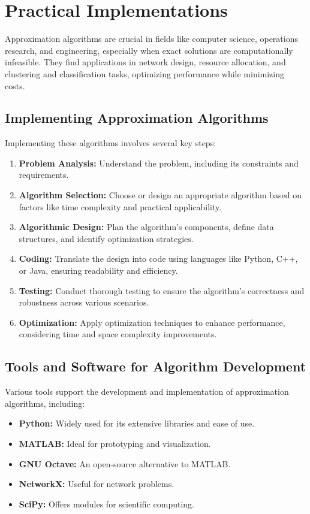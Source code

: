 \documentclass[12pt]{book} %
\begin{document}
\section{Practical Implementations}

Approximation algorithms are crucial in fields like computer science, operations research, and engineering, especially when exact solutions are computationally infeasible. They find applications in network design, resource allocation, and clustering and classification tasks, optimizing performance while minimizing costs.

\subsection{Implementing Approximation Algorithms}

Implementing these algorithms involves several key steps:

\begin{enumerate}
    \item \textbf{Problem Analysis:} Understand the problem, including its constraints and requirements.
    \item \textbf{Algorithm Selection:} Choose or design an appropriate algorithm based on factors like time complexity and practical applicability.
    \item \textbf{Algorithmic Design:} Plan the algorithm's components, define data structures, and identify optimization strategies.
    \item \textbf{Coding:} Translate the design into code using languages like Python, C++, or Java, ensuring readability and efficiency.
    \item \textbf{Testing:} Conduct thorough testing to ensure the algorithm's correctness and robustness across various scenarios.
    \item \textbf{Optimization:} Apply optimization techniques to enhance performance, considering time and space complexity improvements.
\end{enumerate}

\subsection{Tools and Software for Algorithm Development}

Various tools support the development and implementation of approximation algorithms, including:

\begin{itemize}
    \item \textbf{Python:} Widely used for its extensive libraries and ease of use.
    \item \textbf{MATLAB:} Ideal for prototyping and visualization.
    \item \textbf{GNU Octave:} An open-source alternative to MATLAB.
    \item \textbf{NetworkX:} Useful for network problems.
    \item \textbf{SciPy:} Offers modules for scientific computing.
\end{itemize}
\end{document}
